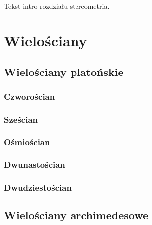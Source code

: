 
Tekst intro rozdziału stereometria.

\section{Wielościany}

\subsection{Wielościany platońskie}
\subsubsection{Czworościan}
\subsubsection{Sześcian}
\subsubsection{Ośmiościan}
\subsubsection{Dwunastościan}
\subsubsection{Dwudziestościan}

\subsection{Wielościany archimedesowe}

